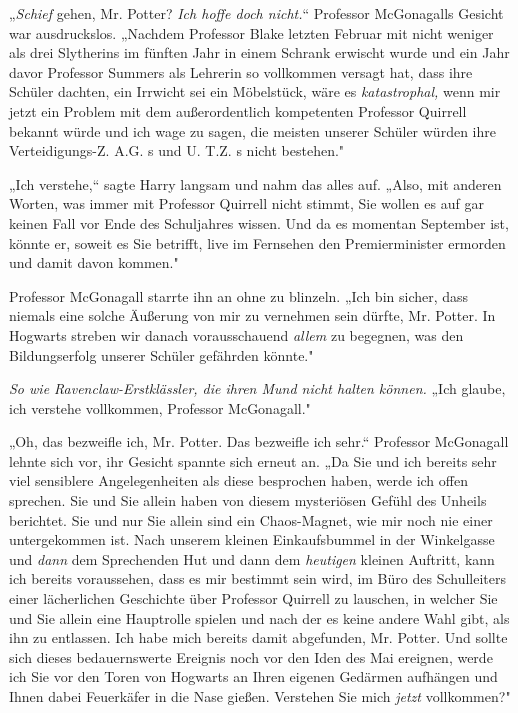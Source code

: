 {„\emph{Schief} gehen, Mr. Potter? \emph{Ich hoffe doch nicht.}“ Professor McGonagalls Gesicht war ausdruckslos. „Nachdem Professor Blake letzten Februar mit nicht weniger als drei Slytherins im fünften Jahr in einem Schrank erwischt wurde und ein Jahr davor Professor Summers als Lehrerin so vollkommen versagt hat, dass ihre Schüler dachten, ein Irrwicht sei ein Möbelstück, wäre es \emph{katastrophal,} wenn mir jetzt ein Problem mit dem außerordentlich kompetenten Professor Quirrell bekannt würde und ich wage zu sagen, die meisten unserer Schüler würden ihre Verteidigungs-Z. A.G. s und U. T.Z. s nicht bestehen."

„Ich verstehe,“ sagte Harry langsam und nahm das alles auf. „Also, mit anderen Worten, was immer mit Professor Quirrell nicht stimmt, Sie wollen es auf gar keinen Fall vor Ende des Schuljahres wissen. Und da es momentan September ist, könnte er, soweit es Sie betrifft, live im Fernsehen den Premierminister ermorden und damit davon kommen."

Professor McGonagall starrte ihn an ohne zu blinzeln. „Ich bin sicher, dass niemals eine solche Äußerung von mir zu vernehmen sein dürfte, Mr. Potter. In Hogwarts streben wir danach vorausschauend \emph{allem} zu begegnen, was den Bildungserfolg unserer Schüler gefährden könnte."

\emph{So wie Ravenclaw-Erstklässler, die ihren Mund nicht halten können.} „Ich glaube, ich verstehe vollkommen, Professor McGonagall."

„Oh, das bezweifle ich, Mr. Potter. Das bezweifle ich sehr.“ Professor McGonagall lehnte sich vor, ihr Gesicht spannte sich erneut an. „Da Sie und ich bereits sehr viel sensiblere Angelegenheiten als diese besprochen haben, werde ich offen sprechen. Sie und Sie allein haben von diesem mysteriösen Gefühl des Unheils berichtet. Sie und nur Sie allein sind ein Chaos-Magnet, wie mir noch nie einer untergekommen ist. Nach unserem kleinen Einkaufsbummel in der Winkelgasse und \emph{dann} dem Sprechenden Hut und dann dem \emph{heutigen} kleinen Auftritt, kann ich bereits voraussehen, dass es mir bestimmt sein wird, im Büro des Schulleiters einer lächerlichen Geschichte über Professor Quirrell zu lauschen, in welcher Sie und Sie allein eine Hauptrolle spielen und nach der es keine andere Wahl gibt, als ihn zu entlassen. Ich habe mich bereits damit abgefunden, Mr. Potter. Und sollte sich dieses bedauernswerte Ereignis noch vor den Iden des Mai ereignen, werde ich Sie vor den Toren von Hogwarts an Ihren eigenen Gedärmen aufhängen und Ihnen dabei Feuerkäfer in die Nase gießen. Verstehen Sie mich \emph{jetzt} vollkommen?"

}
